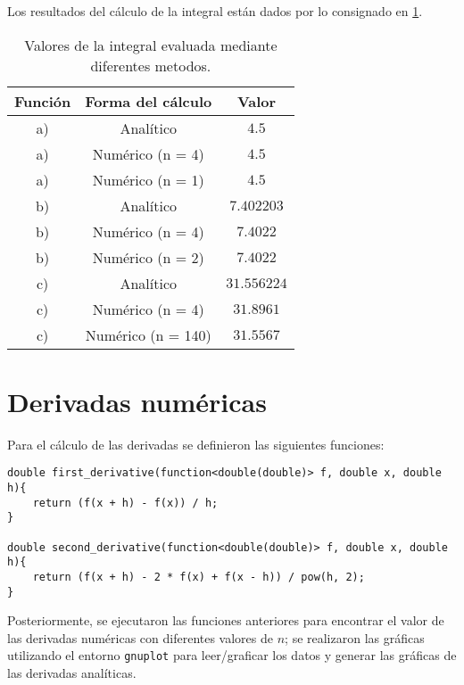 \documentclass[10pt]{article}
\begin{document}
    Los resultados del cálculo de la integral están dados por lo consignado en \ref{tab:valorintegral}.
    
    \begin{table}[H]
        \centering
        \begin{tabular}{|c|c|c|}
        \hline
            \textbf{Función} & \textbf{Forma del cálculo} & \textbf{Valor} \\ 
        \hline
            a)  & Analítico          & $4.5$ \\
            a)  & Numérico (n = 4)   & $4.5$ \\
            a)  & Numérico (n = 1)   & $4.5$ \\
            \hline
            b)  & Analítico          & $7.402203$ \\
            b)  & Numérico (n = 4)   & $7.4022$ \\
            b)  & Numérico (n = 2)  & $7.4022$ \\
            \hline
            c)  & Analítico          & $31.556224$ \\
            c)  & Numérico (n = 4)   & $31.8961$ \\
            c)  & Numérico (n = 140)  & $31.5567$ \\
        \hline
        \end{tabular}
        \caption{Valores de la integral evaluada mediante diferentes metodos.}
        \label{tab:valorintegral}
    \end{table}
    
    \section{Derivadas numéricas}
    Para el cálculo de las derivadas se definieron las siguientes funciones:
    
    \begin{verbatim}
double first_derivative(function<double(double)> f, double x, double h){
    return (f(x + h) - f(x)) / h;
}

double second_derivative(function<double(double)> f, double x, double h){
    return (f(x + h) - 2 * f(x) + f(x - h)) / pow(h, 2);
}
    \end{verbatim}
    
    Posteriormente, se ejecutaron las funciones anteriores para encontrar el valor de las derivadas numéricas con diferentes valores de $n$; se realizaron las gráficas utilizando el entorno \texttt{gnuplot} para leer/graficar los datos y generar las gráficas de las derivadas analíticas.
    
\end{document}
